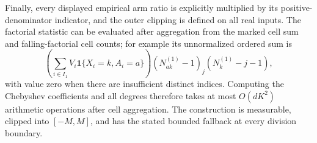 Finally, every displayed empirical arm ratio is explicitly multiplied by its positive-denominator indicator, and the outer clipping is defined on all real inputs.  The factorial statistic can be evaluated after aggregation from the marked cell sum and falling-factorial cell counts; for example its unnormalized ordered sum is
\[
 \left(\sum_{i\in I_1}V_i\mathbf1\{X_i=k,A_i=a\}\right)
 (N_{ak}^{(1)}-1)_j(N_k^{(1)}-j-1),
\]
with value zero when there are insufficient distinct indices.  Computing the Chebyshev coefficients and all degrees therefore takes at most \(O(dK^2)\) arithmetic operations after cell aggregation.  The construction is measurable, clipped into \([-M,M]\), and has the stated bounded fallback at every division boundary.